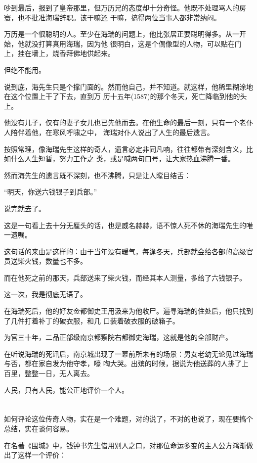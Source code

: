 \documentclass[11pt,a4paper,onecolumn]{article}
\begin{document}
吵到最后，报到了皇帝那里，但万历兄的态度却十分奇怪。他既不处理骂人的房寰，也不批准海瑞辞职。该干嘛还
干嘛，搞得两位当事人都非常纳闷。

万历是一个很聪明的人。至少在海瑞的问题上，他比张居正要聪明得多。从一开始，他就没打算真用海瑞，因为他
很明白，这是个偶像型的人物，可以贴在门上，挂在墙上，烧香拜佛地供起来。

但绝不能用。

说到底，海先生只是个撑门面的。然而他自己，并不知道。就这样，他稀里糊涂地在这个位置上干了下去，直到万
历十五年(1587)的那个冬天，死亡降临到他的头上。

他没有儿子，仅有的妻子女儿也已先他而去。在他生命的最后一刻，只有一个老仆人陪伴着他，在寒风呼啸之中，
海瑞对仆人说出了人生的最后遗言。

按照常理，像海瑞先生这样的奇人，遗言必定非同凡响，往往都带有深刻含义，比如什么人生短暂，努力工作之
类，或是喊两句口号，让大家热血沸腾一番。

然而海先生的遗言既不深刻，也不沸腾，只是让人瞠目结舌：

``明天，你送六钱银子到兵部。''

说完就去了。

这是一句看上去十分无厘头的话，也是威名赫赫，语不惊人死不休的海瑞先生的唯一遗嘱。

这句话的来由是这样的：由于当年没有暖气，每逢冬天，兵部就会给各部的高级官员送柴火钱，数量也不多。

而在他死之前的那天，兵部送来了柴火钱，而经其本人测量，多给了六钱银子。

这一次，我是彻底无语了。

在海瑞死后，他的好友佥都御史王用汲来为他收尸。遍寻海瑞的住处后，他只找到了几件打着补丁的破衣服，和几
口装着破衣服的破箱子。

为官三十年，二品正部级南京都察院右都御史海瑞，这就是他的全部财产。

在听说海瑞的死讯后，南京城出现了一幕前所未有的场景：男女老幼无论见过海瑞与否，都在家自发为他守孝，嚎
啕大哭。出殡的时候，据说为他送葬的人排了上百里，整整一日，无人离去。

人民，只有人民，能公正地评价一个人。

\section[\thesection]{}

如何评论这位传奇人物，实在是一个难题，对的说了，不对的也说了，现在要搞个总结，实在谈何容易。

在名著《围城》中，钱钟书先生借用别人之口，对那位命运多变的主人公方鸿渐做出了这样一个评价：
\end{document}
